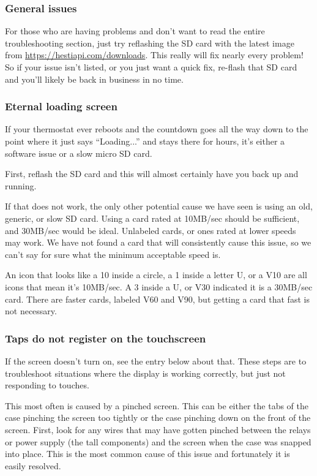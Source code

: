 \subsubsection{General issues}
For those who are having problems and don't want to read the entire
troubleshooting section, just try reflashing the SD card with the latest image
from \url{https://hestiapi.com/downloads}. This really will fix nearly every
problem! So if your issue isn't listed, or you just want a quick fix, re-flash
that SD card and you'll likely be back in business in no time.

\subsubsection{Eternal loading screen}
If your thermostat ever reboots and the countdown goes all the way down to the
point where it just says ``Loading...'' and stays there for hours, it's either
a software issue or a slow micro SD card.

First, reflash the SD card and this will almost certainly have you back up and
running.

If that does not work, the only other potential cause we have seen is using an
old, generic, or slow SD card. Using a card rated at 10MB/sec should be
sufficient, and 30MB/sec would be ideal. Unlabeled cards, or ones rated at
lower speeds may work. We have not found a card that will consistently cause
this issue, so we can't say for sure what the minimum acceptable speed is.

An icon that looks like a 10 inside a circle, a 1 inside a letter U, or a V10
are all icons that mean it's 10MB/sec. A 3 inside a U, or V30 indicated it is
a 30MB/sec card. There are faster cards, labeled V60 and V90, but getting a
card that fast is not necessary.

\subsubsection{Taps do not register on the touchscreen}
If the screen doesn't turn on, see the entry below about that. These steps are
to troubleshoot situations where the display is working correctly, but just not
responding to touches.

This most often is caused by a pinched screen. This can be either the tabs of
the case pinching the screen too tightly or the case pinching down on the front
of the screen. First, look for any wires that may have gotten pinched between
the relays or power supply (the tall components) and the screen when the case
was snapped into place. This is the most common cause of this issue and
fortunately it is easily resolved.

